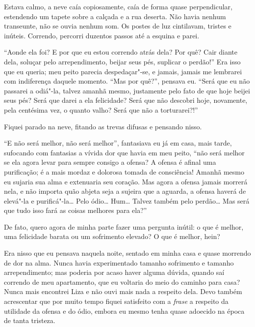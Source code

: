 Estava calmo, a neve caía copiosamente, caía de forma quase
perpendicular, estendendo um tapete sobre a calçada e a rua deserta.
Não havia nenhum transeunte, não se ouvia nenhum som. Os postes de luz
cintilavam, tristes e inúteis. Correndo, percorri duzentos passos até a
esquina e parei.

``Aonde ela foi? E por que eu estou correndo atrás dela? Por quê? Cair
diante dela, soluçar pelo arrependimento, beijar seus pés, suplicar o
perdão!'' Era isso que eu queria; meu peito parecia despedaçar"-se, e
jamais, jamais me lembrarei com indiferença daquele momento. ``Mas por
quê?'', pensava eu. ``Será que eu não passarei a odiá"-la, talvez amanhã
mesmo, justamente pelo fato de que hoje beijei seus pés? Será que darei
a ela felicidade? Será que não descobri hoje, novamente, pela centésima
vez, o quanto valho? Será que não a torturarei?!''

Fiquei parado na neve, fitando as trevas difusas e pensando nisso.

``E não será melhor, não será melhor'', fantasiava eu já em casa, mais
tarde, sufocando com fantasias a vívida dor que havia em meu peito,
``não será melhor se ela agora levar para sempre consigo a ofensa? A
ofensa é afinal uma purificação; é a mais mordaz e dolorosa tomada de
consciência! Amanhã mesmo eu sujaria sua alma e extenuaria seu coração.
Mas agora a ofensa jamais morrerá nela, e não importa quão abjeta seja
a sujeira que a aguarda, a ofensa haverá de elevá"-la e purificá"-la\ldots{}
Pelo ódio\ldots{} Hum\ldots{} Talvez também pelo perdão\ldots{} Mas será que tudo isso
fará as coisas melhores para ela?''

De fato, quero agora de minha parte fazer uma pergunta inútil: o que é
melhor, uma felicidade barata ou um sofrimento elevado? O que é
melhor, hein?

Era nisso que eu pensava naquela noite, sentado em minha casa e quase
morrendo de dor na alma. Nunca havia experimentado tamanho sofrimento e
tamanho arrependimento; mas poderia por acaso haver alguma dúvida,
quando saí correndo de meu apartamento, que eu voltaria do meio do
caminho para casa? Nunca mais encontrei Liza e não ouvi mais nada a
respeito dela. Devo também acrescentar que por muito tempo fiquei
satisfeito com a \textit{frase} a respeito da utilidade da ofensa e do
ódio, embora eu mesmo tenha quase adoecido na época de tanta tristeza.

